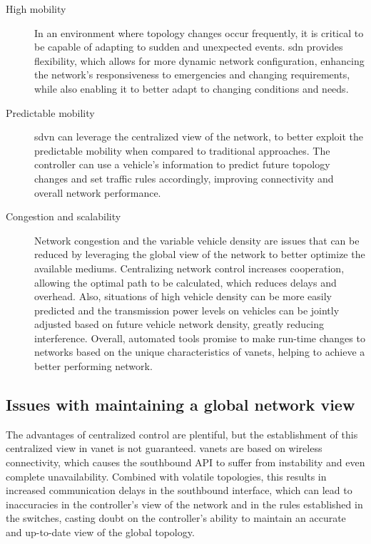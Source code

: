 \begin{description}
    \item[High mobility] In an environment where topology changes occur frequently, it is critical to be capable of adapting to sudden and unexpected events. \gls{sdn} provides flexibility, which allows for more dynamic network configuration, enhancing the network's responsiveness to emergencies and changing requirements, while also enabling it to better adapt to changing conditions and needs\cite{ku_towards_2014}.
    \item[Predictable mobility] \gls{sdvn} can leverage the centralized view of the network, to better exploit the predictable mobility when compared to traditional approaches. The controller can use a vehicle's information to predict future topology changes and set traffic rules accordingly, improving connectivity and overall network performance.  
    \item[Congestion and scalability] Network congestion and the variable vehicle density are issues that can be reduced by leveraging the global view of the network to better optimize the available mediums. Centralizing network control increases cooperation, allowing the optimal path to be calculated, which reduces delays and overhead\cite{smida_efficient_2020}. Also, situations of high vehicle density can be more easily predicted and the transmission power levels on vehicles can be jointly adjusted based on future vehicle network density, greatly reducing interference\cite{smida_efficient_2020}. Overall, automated tools promise to make run-time changes to networks based on the unique characteristics of \glspl{vanet}, helping to achieve a better performing network.
\end{description}

\subsection{Issues with maintaining a global network view}

The advantages of centralized control are plentiful, but the establishment of this centralized view in \gls{vanet} is not guaranteed. \glspl{vanet} are based on wireless connectivity, which causes the southbound API to suffer from instability and even complete unavailability\cite{cardona_software-defined_2020}. Combined with volatile topologies, this results in increased communication delays in the southbound interface, which can lead to inaccuracies in the controller's view of the network and in the rules established in the switches, casting doubt on the controller's ability to maintain an accurate and up-to-date view of the global topology\cite{ben_jaballah_security_2020}. 

